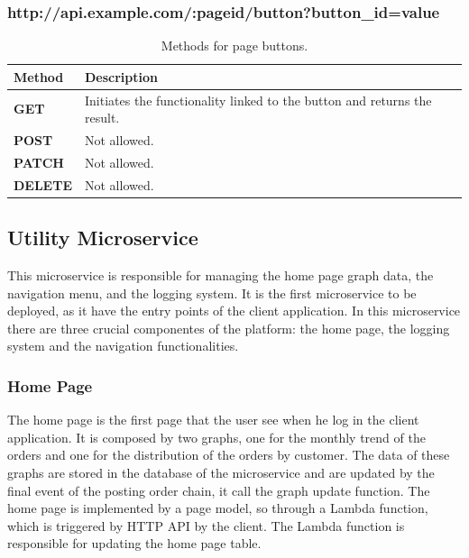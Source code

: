 \subsubsection{http://api.example.com/:pageid/button?button\_id=value}
\begin{table}[!ht]
    \centering
    \begin{tabular}{|m{2cm}|m{10cm}|}
        \hline
        \textbf{Method} & \textbf{Description}                                   \\ \hline
        \textbf{GET}    &
        Initiates the functionality linked to the button and returns the result. \\ \hline
        \textbf{POST}   &
        Not allowed.                                                             \\ \hline
        \textbf{PATCH}  &
        Not allowed.                                                             \\ \hline
        \textbf{DELETE} &
        Not allowed.                                                             \\ \hline
    \end{tabular}
    \caption{Methods for page buttons.}
    \label{tab:api_rest_3}
\end{table}

\subsection{Utility Microservice}
This microservice is responsible for managing the home page graph data, the navigation menu, and the
logging system. It is the first microservice to be deployed, as it have the entry points of the
client application. In this microservice there are three crucial componentes of the platform: the
home page, the logging system and the navigation functionalities.

\subsubsection{Home Page}
The home page is the first page that the user see when he log in the client application. It is
composed by two graphs, one for the monthly trend of the orders and one for the distribution of the
orders by customer. The data of these graphs are stored in the database of the microservice and are
updated by the final event of the posting order chain, it call the graph update function. The home
page is implemented by a page model, so through a Lambda function, which is triggered by HTTP API by
the client. The Lambda function is responsible for updating the home page table.

